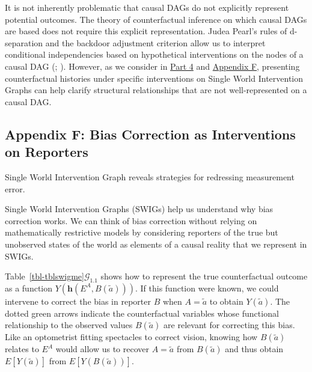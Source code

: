 \documentclass[
  single column]{article}
\begin{document}
It is not inherently problematic that causal DAGs do not explicitly
represent potential outcomes. The theory of counterfactual inference on
which causal DAGs are based does not require this explicit
representation. Judea Pearl's rules of d-separation and the backdoor
adjustment criterion allow us to interpret conditional independencies
based on hypothetical interventions on the nodes of a causal DAG
(;
). However, as we consider in
\hyperref[id-sec-4]{Part 4} and \hyperref[id-app-f]{Appendix F},
presenting counterfactual histories under specific interventions on
Single World Intervention Graphs can help clarify structural
relationships that are not well-represented on a causal DAG.

\newpage{}

\subsection{Appendix F: Bias Correction as Interventions on
Reporters}\label{id-app-F}

\begin{table}

\caption{\label{tbl-tblswigme}Single World Intervention Graph reveals
strategies for redressing measurement error.}

\centering{

\tblswigme

}

\end{table}%

Single World Intervention Graphs (SWIGs) help us understand why bias
correction works. We can think of bias correction without relying on
mathematically restrictive models by considering reporters of the true
but unobserved states of the world as elements of a causal reality that
we represent in SWIGs.

Table~\ref{tbl-tblswigme}\(\mathcal{G}_{1.1}\) shows how to represent
the true counterfactual outcome as a function
\(Y(\mathbf{h}(E^A, B(\tilde{a})))\). If this function were known, we
could intervene to correct the bias in reporter \(B\) when
\(A = \tilde{a}\) to obtain \(Y(\tilde{a})\). The dotted green arrows
indicate the counterfactual variables whose functional relationship to
the observed values \(B(\tilde{a})\) are relevant for correcting this
bias. Like an optometrist fitting spectacles to correct vision, knowing
how \(B(\tilde{a})\) relates to \(E^A\) would allow us to recover
\(A = \tilde{a}\) from \(B(\tilde{a})\) and thus obtain
\(E[Y(\tilde{a})]\) from \(E[Y(B(\tilde{a}))]\).
\end{document}
